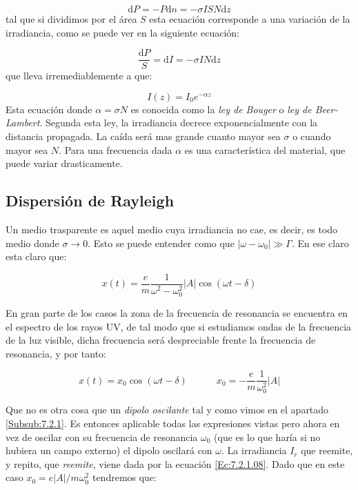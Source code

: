 \documentclass[12pt]{article}
\newcommand{\D}{\mathrm{d}}
\newcommand{\tquad}{\quad \quad \quad}
\numberwithin{equation}{section}
\numberwithin{figure}{section}
\begin{document}
\begin{equation}
\D P = - P \D n = - \sigma I S N \D z
\end{equation}
tal que si dividimos por el área $S$ esta ecuación corresponde a una variación de la irradiancia, como se puede ver en la siguiente ecuación:

\begin{equation}
\dfrac{\D P}{S} = \D I = - \sigma I N \D z
\end{equation}
que lleva irremediablemente a que:

\begin{equation}
I(z)=I_0 e^{-\alpha z}
\end{equation}
Esta ecuación donde $\alpha=\sigma N$ es conocida como la \textit{ley de Bouger} o \textit{ley de Beer-Lambert}. Segunda esta ley, la irradiancia decrece exponencialmente con la distancia propagada. La caída será mas grande cuanto mayor sea $\sigma$ o cuando mayor sea $N$. Para una frecuencia dada $\alpha$ es una característica del material, que puede variar drasticamente. 

\subsection{Dispersión de Rayleigh}

Un medio trasparente es aquel medio cuya irradiancia no cae, es decir, es todo medio donde $\sigma \rightarrow 0$. Esto se puede entender como que $|\omega  - \omega_0| \gg \Gamma$. En ese claro esta claro que:

\begin{equation}
x(t) = \dfrac{e}{m} \dfrac{1}{\omega^2 - \omega_0^2} |A| \cos (\omega t - \delta)
\end{equation}

En gran parte de los casos la zona de la frecuencia de resonancia se encuentra en el espectro de los rayos UV, de tal modo que si estudiamos ondas de la frecuencia de la luz visible, dicha frecuencia será despreciable frente la frecuencia de resonancia, y por tanto:

\begin{equation}
x(t) = x_0 \cos(\omega t - \delta) \tquad x_0 = - \dfrac{e}{m} \dfrac{1}{\omega_0^2} |A|
\end{equation}

Que no es otra cosa que un \textit{dipolo oscilante} tal y como vimos en el apartado  \ref{Subsub:7.2.1}. Es entonces aplicable todas las expresiones vistas pero ahora en vez de oscilar con su frecuencia de resonancia $\omega_0$ (que es lo que haría si no hubiera un campo externo) el dipolo oscilará con $\omega$. La irradiancia $I_r$ que reemite, y repito, que \textit{reemite}, viene dada por la ecuación \ref{Ec:7.2.1.08}. Dado que en este caso $x_0 = e |A| /m \omega_0^2$ tendremos que:
\end{document}
